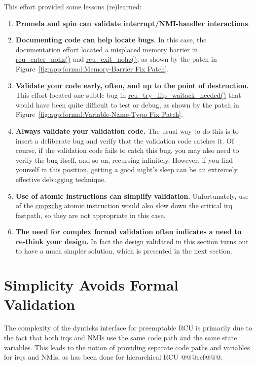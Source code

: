 This effort provided some lessons (re)learned:

\begin{enumerate}
\item	{\bf Promela and spin can validate interrupt/NMI-handler
	interactions}.
\item	{\bf Documenting code can help locate bugs}.
	In this case, the documentation effort located
	a misplaced memory barrier in
	\url{rcu_enter_nohz()} and \url{rcu_exit_nohz()},
	as shown by the patch in
	Figure~\ref{fig:app:formal:Memory-Barrier Fix Patch}.
\item	{\bf Validate your code early, often, and up to the point
	of destruction.}
	This effort located one subtle bug in
	\url{rcu_try_flip_waitack_needed()}
	that would have been quite difficult to test or debug, as
	shown by the patch in
	Figure~\ref{fig:app:formal:Variable-Name-Typo Fix Patch}.
\item	{\bf Always validate your validation code.}
	The usual way to do this is to insert a deliberate bug
	and verify that the validation code catches it.  Of course,
	if the validation code fails to catch this bug, you may also
	need to verify the bug itself, and so on, recursing infinitely.
	However, if you find yourself in this position,
	getting a good night's sleep
	can be an extremely effective debugging technique.
\item	{\bf Use of atomic instructions can simplify validation.}
	Unfortunately, use of the \url{cmpxchg} atomic instruction
	would also slow down the critical irq fastpath, so they
	are not appropriate in this case.
\item	{\bf The need for complex formal validation often indicates
	a need to re-think your design.}
	In fact the design validated in this section turns out to have
	a much simpler solution, which is presented in the next section.
\end{enumerate}

\section{Simplicity Avoids Formal Validation}
\label{app:formal:Simplicity Avoids Formal Validation}

The complexity of the dynticks interface for preemptable RCU is primarily
due to the fact that both irqs and NMIs use the same code path and the
same state variables.
This leads to the notion of providing separate code paths and variables
for irqs and NMIs, as has been done for hierarchical RCU @@@ref@@@.

